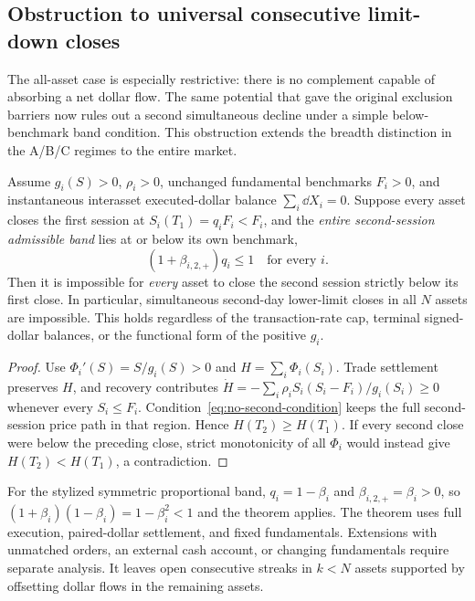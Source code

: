 \documentclass[review,hidelinks,onefignum,onetabnum]{siamonline250211}
\begin{document}
\subsection{Obstruction to universal consecutive limit-down closes}\label{subsec:multiday-full}
The all-asset case is especially restrictive: there is no complement capable of absorbing a net dollar flow. The same potential that gave the original exclusion barriers now rules out a second simultaneous decline under a simple below-benchmark band condition. This obstruction extends the breadth distinction in the A/B/C regimes to the entire market.
\begin{theorem}\label{thm:no-second-global}
Assume $g_i(S)>0$, $\rho_i>0$, unchanged fundamental benchmarks $F_i>0$, and instantaneous interasset executed-dollar balance $\sum_i\dd X_i=0$. Suppose every asset closes the first session at $S_i(T_1)=q_iF_i<F_i$, and the \emph{entire second-session admissible band} lies at or below its own benchmark,
\begin{equation}\label{eq:no-second-condition}
 (1+\beta_{i,2,+})q_i\le1\quad\text{for every }i.
\end{equation}
Then it is impossible for \emph{every} asset to close the second session strictly below its first close. In particular, simultaneous second-day lower-limit closes in all $N$ assets are impossible. This holds regardless of the transaction-rate cap, terminal signed-dollar balances, or the functional form of the positive $g_i$.
\end{theorem}
\begin{proof}
Use $\Phi_i'(S)=S/g_i(S)>0$ and $H=\sum_i\Phi_i(S_i)$. Trade settlement preserves $H$, and recovery contributes
$\dot H=-\sum_i\rho_i S_i(S_i-F_i)/g_i(S_i)\ge0$ whenever every $S_i\le F_i$.
Condition~\eqref{eq:no-second-condition} keeps the full second-session price path in that region. Hence $H(T_2)\ge H(T_1)$. If every second close were below the preceding close, strict monotonicity of all $\Phi_i$ would instead give $H(T_2)<H(T_1)$, a contradiction.
\end{proof}

For the stylized symmetric proportional band, $q_i=1-\beta_i$ and
$\beta_{i,2,+}=\beta_i>0$, so
$(1+\beta_i)(1-\beta_i)=1-\beta_i^2<1$ and the theorem applies. The theorem uses full execution, paired-dollar settlement, and fixed fundamentals. Extensions with unmatched orders, an external cash account, or changing fundamentals require separate analysis. It leaves open consecutive streaks in $k<N$ assets supported by offsetting dollar flows in the remaining assets.
\end{document}
